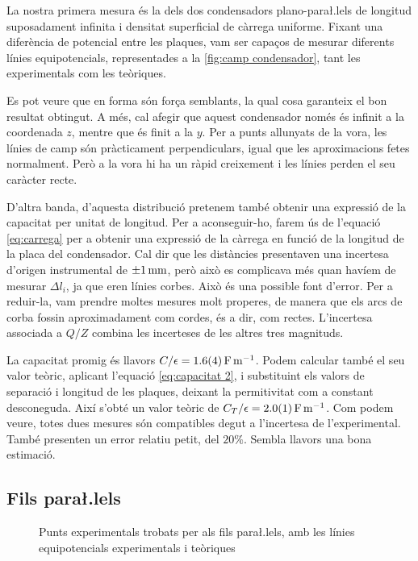 La nostra primera mesura és la dels dos condensadors plano-para\l.lels de longitud suposadament infinita i densitat superficial de càrrega uniforme. Fixant una diferència de potencial entre les plaques, vam ser capaços de mesurar diferents línies equipotencials, representades a la \cref{fig:camp condensador}, tant les experimentals com les teòriques.

Es pot veure que en forma són força semblants, la qual cosa garanteix el bon resultat obtingut. A més, cal afegir que aquest condensador només és infinit a la coordenada $z$, mentre que és finit a la $y$. Per a punts allunyats de la vora, les línies de camp són pràcticament perpendiculars, igual que les aproximacions fetes normalment. Però a la vora hi ha un ràpid creixement i les línies perden el seu caràcter recte.

D'altra banda, d'aquesta distribució pretenem també obtenir una expressió de la capacitat per unitat de longitud. Per a aconseguir-ho, farem ús de l'equació \cref{eq:carrega} per a obtenir una expressió de la càrrega en funció de la longitud de la placa del condensador. Cal dir que les distàncies presentaven una incertesa d'origen instrumental de $ \data{}{1}{mm} $, però això es complicava més quan havíem de mesurar $\Delta l_i$, ja que eren línies corbes. Això és una possible font d'error. Per a reduir-la, vam prendre moltes mesures molt properes, de manera que els arcs de corba fossin aproximadament com cordes, és a dir, com rectes. L'incertesa associada a $Q/Z$ combina les incerteses de les altres tres magnituds.

La capacitat promig és llavors $C/\epsilon = \data{1.6}{0.4}{F.m^{-1}}$. Podem calcular també el seu valor teòric, aplicant l'equació \cref{eq:capacitat 2}, i substituint els valors de separació i longitud de les plaques, deixant la permitivitat com a constant desconeguda.
Així s'obté un valor teòric de $C_T/\epsilon = \data{2.0}{0.1}{F.m^{-1}} $. Com podem veure, totes dues mesures són compatibles degut a l'incertesa de l'experimental. També presenten un error relatiu petit, del $20\%$. Sembla llavors una bona estimació.

\subsection{Fils para\l.lels}
\begin{figure}[htb]
  \centering \small \sffamily
	
  \caption{Punts experimentals trobats per als fils para\l.lels, amb les línies equipotencials experimentals i teòriques}
  \label{fig:camp fils}
\end{figure}

